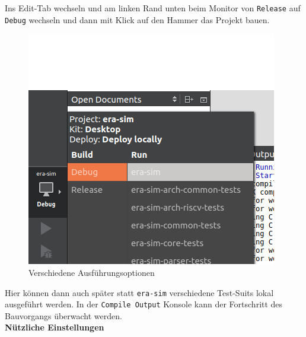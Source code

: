 Ins Edit-Tab wechseln und am linken Rand unten beim Monitor von \texttt{Release} auf
\texttt{Debug} wechseln und dann mit Klick auf den Hammer das Projekt bauen.\\
\begin{figure}[H]
	\centering
	\includegraphics[scale=0.7]{images/setup-qtcreator-change-buildrun-flavor.png}
	\caption{Verschiedene Ausführungsoptionen}
\end{figure}
Hier können dann auch später statt \texttt{era-sim} verschiedene Test-Suits lokal
ausgeführt werden. In der \texttt{Compile Output} Konsole kann der Fortschritt des
Bauvorgangs überwacht werden.\\


\textbf{Nützliche Einstellungen}

